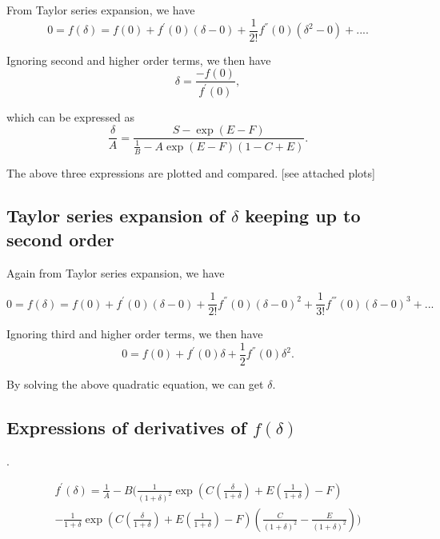 \documentclass[12pt]{article}
\begin{document}
From Taylor series expansion, we have
\begin{equation}
0=f(\delta)=f(0)+f^{'}(0)(\delta-0)+\frac{1}{2!}f^{''}(0)(\delta^{2}-0)+....
\end{equation}

Ignoring second and higher order terms, we then have
\begin{equation}
\delta=\frac{-f(0)}{f^{'}(0)},
\end{equation}

which can be expressed as
\begin{equation}
\frac{\delta}{A}=\frac{S-\exp(E-F)}{\frac{1}{B}-A \exp(E-F) (1-C+E)}.
\end{equation}

The above three expressions are plotted and compared. [see attached plots]

\subsection{Taylor series expansion of $\delta$ keeping up to second order}

Again from Taylor series expansion, we have

\begin{equation}
0=f(\delta)=f(0)+f^{'}(0)(\delta-0)+\frac{1}{2!}f^{''}(0)(\delta-0)^{2}+ \frac{1}{3!} f^{'''}(0)(\delta-0)^{3}+...
\end{equation}

Ignoring third and higher order terms, we then have
\begin{equation}
0=f(0)+f^{'}(0)\delta+\frac{1}{2}f^{''}(0)\delta^{2}.
\end{equation}

By solving the above quadratic equation, we can get $\delta$.

\subsection{Expressions of derivatives of $f(\delta)$}.

\begin{eqnarray}
f^{'}(\delta)=\frac{1}{A}-B(\frac{1}{(1+\delta)^{2}}\exp(C (\frac{\delta}{1+\delta})+E(\frac{1}{1+
\delta})-F) \\ \nonumber
-\frac{1}{1+\delta}\exp(C (\frac{\delta}{1+\delta})+E(\frac{1}{1+\delta})-F)(\frac{C}{(1+\delta)^{2}}-\frac{E}{(1+\delta)^{2}}))
\end{eqnarray}
\end{document}

